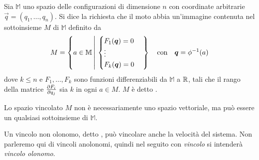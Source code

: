 \begin{definition}
  Sia $\mathbb{M}$ uno spazio delle configurazioni di dimensione $n$ con coordinate arbitrarie $\vec{q} = (q_1, \ldots, q_n)$. Si dice  la richiesta che il moto abbia un'immagine contenuta nel sottoinsieme $M$ di $\mathbb{M}$ definito da \begin{equation}
    M = \left\{ a \in \mathbb{M} \left|\ \begin{cases} 
      F_1(\vec{q}) = 0 \\
      \vdots \\
      F_k(\vec{q}) = 0
    \end{cases} \right. \right\} \qqtext{con} \vec{q} = \phi^{-1}(a)
  \end{equation} 
  dove $k \le n$ e $F_1, \ldots, F_k$ sono funzioni differenziabili da $\mathbb{M}$ a $\mathbb{R}$, tali che il rango della matrice $\pdv{F_i}{q_j}(a)$ sia $k$ in ogni $a \in M$. $M$ è detto .
\end{definition}
\begin{remark}
  Lo spazio vincolato $M$ non è necessariamente uno spazio vettoriale, ma può essere un qualsiasi sottoinsieme di $\mathbb{M}$.
\end{remark}
\begin{remark}
  Un vincolo non olonomo, detto , può vincolare anche la velocità del sistema. Non parleremo qui di vincoli anolonomi, quindi nel seguito con \emph{vincolo} si intenderà \emph{vincolo olonomo}.
\end{remark}

